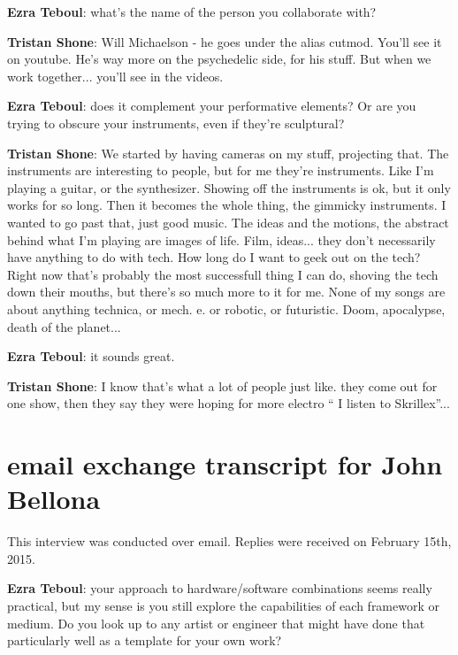 \textbf{Ezra Teboul}: what's the name of the person you collaborate with? 

\textbf{Tristan Shone}: Will Michaelson - he goes under the alias cutmod. You'll see it on youtube. He's way more on the psychedelic side, for his stuff. But when we work together... you'll see in the videos. 

\textbf{Ezra Teboul}: does it complement your performative elements? Or are you trying to obscure your instruments, even if they're sculptural? 

\textbf{Tristan Shone}: We started by having cameras on my stuff, projecting that. The instruments are interesting to people, but for me they're instruments. Like I'm playing a guitar, or the synthesizer. Showing off the instruments is ok, but it only works for so long. Then it becomes the whole thing, the gimmicky instruments. I wanted to go past that, just good music. The ideas and the motions, the abstract behind what I'm playing are images of life. Film, ideas... they don't necessarily have anything to do with tech. How long do I want to geek out on the tech? Right now that's probably the most successfull thing I can do, shoving the tech down their mouths, but there's so much more to it for me. None of my songs are about anything technica, or mech. e. or robotic, or futuristic. Doom, apocalypse, death of the planet... 

\textbf{Ezra Teboul}: it sounds great. 

\textbf{Tristan Shone}: I know that's what a lot of people just like. they come out for one show, then they say they were hoping for more electro `` I listen to Skrillex''... 

\newpage

\clearpage 

\section{email exchange transcript for John Bellona}

This interview was conducted over email. Replies were received on February 15th, 2015. 

\textbf{Ezra Teboul}: your approach to hardware/software combinations seems really
practical, but my sense is you still explore the capabilities of each framework or
medium. Do you look up to any artist or engineer that might have done that particularly
well as a template for your own work?

